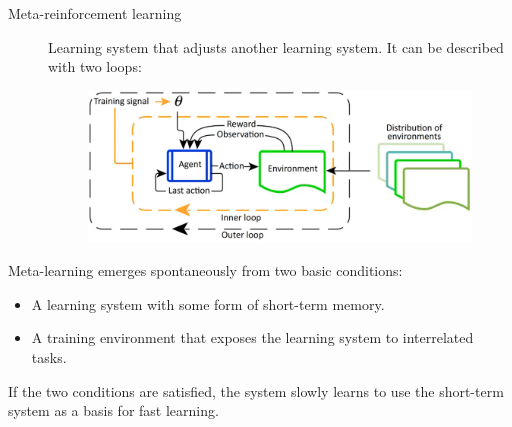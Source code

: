 \begin{description}
    \item[Meta-reinforcement learning] 
        Learning system that adjusts another learning system.
        It can be described with two loops:
        \begin{figure}[H]
            \centering
            \includegraphics[width=0.6\linewidth]{./img/meta_rl.png}
        \end{figure}
\end{description}

\begin{remark}
    Meta-learning emerges spontaneously from two basic conditions:
    \begin{itemize}
        \item A learning system with some form of short-term memory.
        \item A training environment that exposes the learning system to interrelated tasks.
    \end{itemize}
    If the two conditions are satisfied, the system slowly learns to use the short-term system as a basis for fast learning.
\end{remark}

